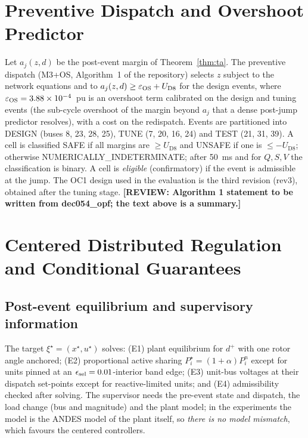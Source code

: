 \documentclass[11pt,twocolumn]{article}
\newcommand{\todo}[1]{\textbf{[REVIEW: #1]}}
\newcommand{\UD}{U_{\mathrm{D8}}}
\begin{document}
\section{Preventive Dispatch and Overshoot Predictor}
\label{sec:dispatch}
Let $a_j(z,d)$ be the post-event margin of Theorem~\ref{thm:ta}. The preventive dispatch (M3+OS, Algorithm~1 of the repository) selects $z$ subject to the network equations and to $a_j(z,d)\ge\varepsilon_{\rm OS}+\UD$ for the design events, where $\varepsilon_{\rm OS}=3.88\times10^{-4}$~pu is an overshoot term calibrated on the design and tuning events (the sub-cycle overshoot of the margin beyond $a_j$ that a dense post-jump predictor resolves), with a cost on the redispatch. Events are partitioned into DESIGN (buses 8, 23, 28, 25), TUNE (7, 20, 16, 24) and TEST (21, 31, 39). A cell is classified SAFE if all margins are $\ge\UD$ and UNSAFE if one is $\le-\UD$; otherwise NUMERICALLY\_INDETERMINATE; after 50~ms and for $Q,S,V$ the classification is binary. A cell is \emph{eligible} (confirmatory) if the event is admissible at the jump. The OC1 design used in the evaluation is the third revision (rev3), obtained after the tuning stage. \todo{Algorithm 1 statement to be written from dec054\_opf; the text above is a summary.}

\section{Centered Distributed Regulation and Conditional Guarantees}
\label{sec:centered}
\subsection{Post-event equilibrium and supervisory information}
The target $\xi^\star=(x^\star,u^\star)$ solves: (E1) plant equilibrium for $d^+$ with one rotor angle anchored; (E2) proportional active sharing $P_i^\star=(1+\alpha)P_i^n$ except for units pinned at an $\epsilon_{\rm sel}=0.01$-interior band edge; (E3) unit-bus voltages at their dispatch set-points except for reactive-limited units; and (E4) admissibility checked after solving. The supervisor needs the pre-event state and dispatch, the load change (bus and magnitude) and the plant model; in the experiments the model is the ANDES model of the plant itself, so \emph{there is no model mismatch}, which favours the centered controllers.
\end{document}
